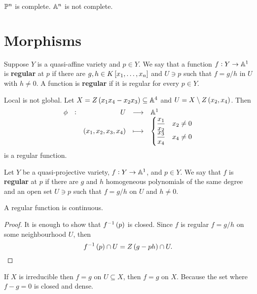 \begin{example}
$ \PP^n $ is complete. $ \AA^n $ is not complete.
\end{example}

\pagebreak

\section{Morphisms}

\begin{definition}
Suppose $ Y $ is a quasi-affine variety and $ p \in Y $. We say that a function $ f : Y \to \AA^1 $ is \textbf{regular} at $ p $ if there are $ g, h \in K\sbr{x_1, \dots, x_n} $ and $ U \ni p $ such that $ f = g / h $ in $ U $ with $ h \ne 0 $. A function is \textbf{regular} if it is regular for every $ p \in Y $.
\end{definition}

\begin{example}
Local is not global. Let $ X = Z\br{x_1x_4 - x_2x_3} \subseteq \AA^4 $ and $ U = X \setminus Z\br{x_2, x_4} $. Then
$$ \function[\phi]{U}{\AA^1}{\br{x_1, x_2, x_3, x_4}}{
\begin{cases}
\dfrac{x_1}{x_2} & x_2 \ne 0 \\
\dfrac{x_3}{x_4} & x_4 \ne 0
\end{cases}
} $$
is a regular function.
\end{example}

\begin{definition}
Let $ Y $ be a quasi-projective variety, $ f : Y \to \AA^1 $, and $ p \in Y $. We say that $ f $ is \textbf{regular} at $ p $ if there are $ g $ and $ h $ homogeneous polynomials of the same degree and an open set $ U \ni p $ such that $ f = g / h $ on $ U $ and $ h \ne 0 $.
\end{definition}

\begin{lemma}
A regular function is continuous.
\end{lemma}

\begin{proof}
It is enough to show that $ f^{-1}\br{p} $ is closed. Since $ f $ is regular $ f = g / h $ on some neighbourhood $ U $, then
$$ f^{-1}\br{p} \cap U = Z\br{g - ph} \cap U. $$
\end{proof}

\begin{remark}
If $ X $ is irreducible then $ f = g $ on $ U \subseteq X $, then $ f = g $ on $ X $. Because the set where $ f - g = 0 $ is closed and dense.
\end{remark}

